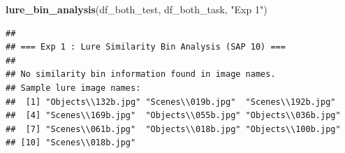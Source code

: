 \documentclass[
]{article}
\newenvironment{Shaded}{\begin{snugshade}}{\end{snugshade}}
\newcommand{\FunctionTok}[1]{\textcolor[rgb]{0.13,0.29,0.53}{\textbf{#1}}}
\newcommand{\NormalTok}[1]{#1}
\newcommand{\StringTok}[1]{\textcolor[rgb]{0.31,0.60,0.02}{#1}}
\begin{document}
\begin{Shaded}
\begin{Highlighting}[]
\FunctionTok{lure\_bin\_analysis}\NormalTok{(df\_both\_test, df\_both\_task, }\StringTok{"Exp 1"}\NormalTok{)}
\end{Highlighting}
\end{Shaded}

\begin{verbatim}
## 
## === Exp 1 : Lure Similarity Bin Analysis (SAP 10) ===
## 
## No similarity bin information found in image names.
## Sample lure image names:
##  [1] "Objects\\132b.jpg" "Scenes\\019b.jpg"  "Scenes\\192b.jpg" 
##  [4] "Scenes\\169b.jpg"  "Objects\\055b.jpg" "Objects\\036b.jpg"
##  [7] "Scenes\\061b.jpg"  "Objects\\018b.jpg" "Objects\\100b.jpg"
## [10] "Scenes\\018b.jpg"
\end{verbatim}
\end{document}
